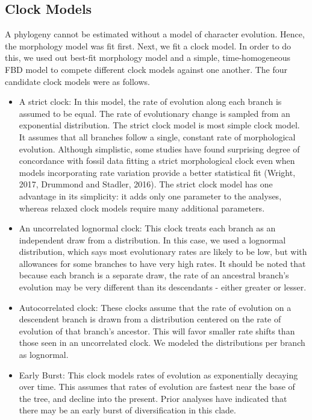 \documentclass{article}
\begin{document}
\subsection{Clock Models}

A phylogeny cannot be estimated without a model of character evolution. 
Hence, the morphology model was fit first.
Next, we fit a clock model. 
In order to do this, we used out best-fit morphology model and a simple, time-homogeneous FBD model to compete different clock models against one another.
The four candidate clock models were as follows.
\begin{itemize}
    \item A strict clock: In this model, the rate of evolution along each branch is assumed to be equal. The rate of evolutionary change is sampled from an exponential distribution. 
    The strict clock model is most simple clock model. 
    It assumes that all branches follow a single, constant rate of morphological evolution. 
    Although simplistic, some studies have found surprising degree of concordance with fossil data fitting a strict morphological clock even when models incorporating rate variation provide a better statistical fit (Wright, 2017, Drummond and Stadler, 2016). 
    The strict clock model has one advantage in its simplicity: it adds only one parameter to the analyses, whereas relaxed clock models require many additional parameters.
    \item An uncorrelated lognormal clock: This clock treats each branch as an independent draw from a distribution.  
    In this case, we used a lognormal distribution, which says most evolutionary rates are likely to be low, but with allowances for some branches to have very high rates. 
    It should be noted that because each branch is a separate draw, the rate of an ancestral branch's evolution may be very different than its descendants - either greater or lesser.
    \item Autocorrelated clock: These clocks assume that the rate of evolution on a descendent branch is drawn from a distribution centered on the rate of evolution of that branch's ancestor. 
    This will favor smaller rate shifts than those seen in an uncorrelated clock. We modeled the distributions per branch as lognormal.
    \item Early Burst: This clock models rates of evolution as exponentially decaying over time. 
    This assumes that rates of evolution are fastest near the base of the tree, and decline into the present. Prior analyses have indicated that there may be an early burst of diversification in this clade. \citep{Pete, was this your idea?}
\end{itemize}
\end{document}
